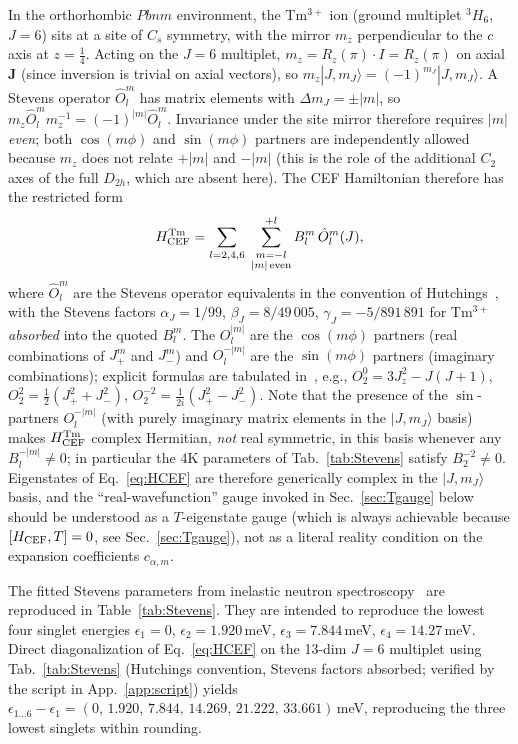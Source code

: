 \documentclass[reprint,amsmath,amssymb,aps,prb,longbibliography]{revtex4-2}
\newcommand{\fix}[1]{#1}
\newcommand{\half}{\tfrac{1}{2}}
\begin{document}
In the orthorhombic $Pbnm$ environment, the Tm$^{3+}$ ion (ground
multiplet $^3H_6$, $J=6$) sits at a site of $C_s$ symmetry, with the
mirror $m_z$ perpendicular to the $c$ axis at $z=\tfrac14$. \fix{Acting on
the $J=6$ multiplet, $m_z = R_z(\pi)\cdot I = R_z(\pi)$ on axial $\mathbf J$
(since inversion is trivial on axial vectors), so $m_z|J,m_J\rangle =
(-1)^{m_J}|J,m_J\rangle$. A Stevens operator $\hat O_l^m$ has matrix
elements with $\Delta m_J = \pm|m|$, so $m_z\hat O_l^m m_z^{-1} =
(-1)^{|m|}\hat O_l^m$. Invariance under the site mirror therefore
requires $|m|$ \emph{even}; both $\cos(m\phi)$ and $\sin(m\phi)$ partners
are independently allowed because $m_z$ does not relate $+|m|$ and
$-|m|$ (this is the role of the additional $C_2$ axes of the full
$D_{2h}$, which are absent here). The CEF Hamiltonian therefore has the
restricted form}
\begin{equation}
H_{\rm CEF}^{\rm Tm} = \sum_{l=2,4,6}\;\sum_{\substack{m=-l\\ |m|\,\rm even}}^{+l} B_l^m\,\hat O_l^m(J),
\label{eq:HCEF}
\end{equation}
where $\hat O_l^m$ are the Stevens operator equivalents in the convention
of Hutchings~\cite{Hutchings1964}, with the Stevens factors $\alpha_J=
1/99$, $\beta_J=8/49\,005$, $\gamma_J=-5/891\,891$ for Tm$^{3+}$
\emph{absorbed} into the quoted $B_l^m$. The $O_l^{|m|}$ are the
$\cos(m\phi)$ partners (real combinations of $J_+^m$ and $J_-^m$) and
$O_l^{-|m|}$ are the $\sin(m\phi)$ partners (imaginary combinations);
explicit formulas are tabulated in~\cite{Hutchings1964}, e.g.,
$O_2^0=3J_z^2-J(J+1)$, $O_2^2=\half(J_+^2+J_-^2)$, $O_2^{-2}=
\frac{1}{2i}(J_+^2-J_-^2)$. \fix{Note that the presence of
the $\sin$-partners $O_l^{-|m|}$ (with purely imaginary matrix elements
in the $|J,m_J\rangle$ basis) makes $H_{\rm CEF}^{\rm Tm}$ complex
Hermitian, \emph{not} real symmetric, in this basis whenever any
$B_l^{-|m|}\neq 0$; in particular the 4K parameters of
Tab.~\ref{tab:Stevens} satisfy $B_2^{-2}\neq 0$. Eigenstates of
Eq.~\eqref{eq:HCEF} are therefore generically complex in the
$|J,m_J\rangle$ basis, and the ``real-wavefunction'' gauge invoked in
Sec.~\ref{sec:Tgauge} below should be understood as a $T$-eigenstate
gauge (which is always achievable because $[H_{\rm CEF},T]=0$, see
Sec.~\ref{sec:Tgauge}), not as a literal reality condition on the
expansion coefficients $c_{\alpha,m}$.}

The fitted Stevens parameters from inelastic neutron
spectroscopy~\cite{Skorobogatov2020} are reproduced in
Table~\ref{tab:Stevens}. They are intended to reproduce the lowest four
singlet energies $\epsilon_1=0$, $\epsilon_2=1.920$\,meV,
$\epsilon_3=7.844$\,meV, $\epsilon_4=14.27$\,meV. \fix{Direct
diagonalization of Eq.~\eqref{eq:HCEF} on the 13-dim $J=6$ multiplet
using Tab.~\ref{tab:Stevens} (Hutchings convention, Stevens factors
absorbed; verified by the script in App.~\ref{app:script}) yields
$\epsilon_{1\ldots 6}-\epsilon_1 = (0,\,1.920,\,7.844,\,14.269,\,21.222,\,33.661)$\,meV,
reproducing the three lowest singlets within rounding.}
\end{document}
